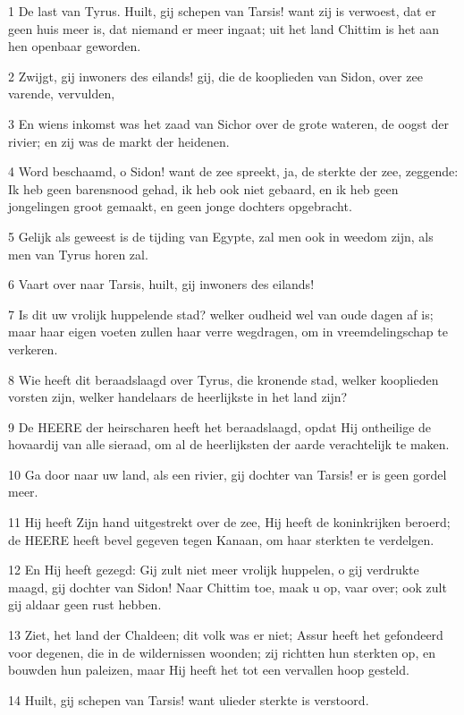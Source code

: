 \par 1 De last van Tyrus. Huilt, gij schepen van Tarsis! want zij is verwoest, dat er geen huis meer is, dat niemand er meer ingaat; uit het land Chittim is het aan hen openbaar geworden.
\par 2 Zwijgt, gij inwoners des eilands! gij, die de kooplieden van Sidon, over zee varende, vervulden,
\par 3 En wiens inkomst was het zaad van Sichor over de grote wateren, de oogst der rivier; en zij was de markt der heidenen.
\par 4 Word beschaamd, o Sidon! want de zee spreekt, ja, de sterkte der zee, zeggende: Ik heb geen barensnood gehad, ik heb ook niet gebaard, en ik heb geen jongelingen groot gemaakt, en geen jonge dochters opgebracht.
\par 5 Gelijk als geweest is de tijding van Egypte, zal men ook in weedom zijn, als men van Tyrus horen zal.
\par 6 Vaart over naar Tarsis, huilt, gij inwoners des eilands!
\par 7 Is dit uw vrolijk huppelende stad? welker oudheid wel van oude dagen af is; maar haar eigen voeten zullen haar verre wegdragen, om in vreemdelingschap te verkeren.
\par 8 Wie heeft dit beraadslaagd over Tyrus, die kronende stad, welker kooplieden vorsten zijn, welker handelaars de heerlijkste in het land zijn?
\par 9 De HEERE der heirscharen heeft het beraadslaagd, opdat Hij ontheilige de hovaardij van alle sieraad, om al de heerlijksten der aarde verachtelijk te maken.
\par 10 Ga door naar uw land, als een rivier, gij dochter van Tarsis! er is geen gordel meer.
\par 11 Hij heeft Zijn hand uitgestrekt over de zee, Hij heeft de koninkrijken beroerd; de HEERE heeft bevel gegeven tegen Kanaan, om haar sterkten te verdelgen.
\par 12 En Hij heeft gezegd: Gij zult niet meer vrolijk huppelen, o gij verdrukte maagd, gij dochter van Sidon! Naar Chittim toe, maak u op, vaar over; ook zult gij aldaar geen rust hebben.
\par 13 Ziet, het land der Chaldeen; dit volk was er niet; Assur heeft het gefondeerd voor degenen, die in de wildernissen woonden; zij richtten hun sterkten op, en bouwden hun paleizen, maar Hij heeft het tot een vervallen hoop gesteld.
\par 14 Huilt, gij schepen van Tarsis! want ulieder sterkte is verstoord.
